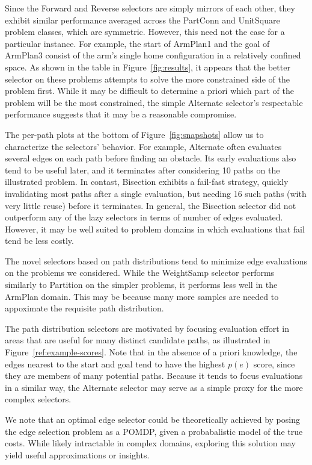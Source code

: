 Since the Forward and Reverse selectors are simply mirrors of each
other,
they exhibit similar performance
averaged across the PartConn and UnitSquare problem classes,
which are symmetric.
However,
this need not the case for a particular instance.
For example,
the start of ArmPlan1 and the goal of ArmPlan3 consist
of the arm's single home configuration in a relatively confined space.
As shown in the table in
Figure~\ref{fig:results},
it appears that the better selector on these problems attempts
to solve the more constrained side of the problem first.
While it may be difficult to determine a priori which part of the
problem will be the most constrained,
the simple Alternate selector's respectable performance
suggests that it may be a reasonable compromise.

The per-path plots at the bottom of Figure~\ref{fig:snapshots}
allow us to characterize the selectors' behavior.
For example,
Alternate often evaluates several edges on each path before finding
an obstacle.
Its early evaluations also tend to be useful later,
and it terminates after considering 10 paths on the illustrated problem.
In contast, Bisection exhibits a fail-fast strategy,
quickly invalidating most paths after a single evaluation,
but needing 16 such paths (with very little reuse)
before it terminates.
In general, the Bisection selector did not outperform any of the
lazy selectors in terms of number of edges evaluated.
However,
it may be well suited to problem domains in which
evaluations that fail tend be less costly.

The novel selectors based on path distributions tend to minimize
edge evaluations on the problems we considered.
While the WeightSamp selector performs similarly to Partition on the
simpler problems,
it performs less well in the ArmPlan domain.
This may be because many more samples are needed to appoximate
the requisite path distribution.

The path distribution selectors are motivated by focusing evaluation
effort in areas that are useful for many distinct candidate paths,
as illustrated in Figure~\ref{ref:example-scores}.
Note that in the absence of a priori knowledge,
the edges nearest to the start and goal tend to have the highest
$p(e)$ score,
since they are members of many potential paths.
Because it tends to focus evaluations in a similar way,
the Alternate selector may serve as a simple proxy for the
more complex selectors.

We note that
an optimal edge selector could be theoretically achieved by posing the
edge selection problem as a POMDP,
given a probabalistic model of the true costs.
While likely intractable in complex domains,
exploring this solution may yield useful approximations or insights.
